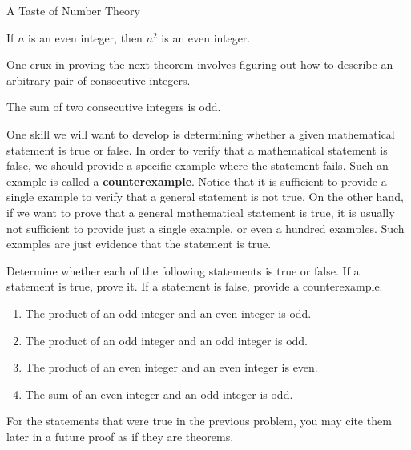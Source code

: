 \begin{section}{A Taste of Number Theory}
\begin{theorem}\label{thm:n even implies n^2 even}
If $n$ is an even integer, then $n^2$ is an even integer.
\end{theorem}

One crux in proving the next theorem involves figuring out how to describe an arbitrary pair of consecutive integers.

\begin{theorem}\label{thm:two consecutive ints}
The sum of two consecutive integers is odd.
\end{theorem}

One skill we will want to develop is determining whether a given mathematical statement is true or false.  In order to verify that a mathematical statement is false, we should provide a specific example where the statement fails. Such an example is called a \textbf{counterexample}.  Notice that it is sufficient to provide a single example to verify that a general statement is not true.  On the other hand, if we want to prove that a general mathematical statement is true, it is usually not sufficient to provide just a single example, or even a hundred examples.  Such examples are just evidence that the statement is true.

\begin{problem}
Determine whether each of the following statements is true or false.  If a statement is true, prove it. If a statement is false, provide a counterexample.
\begin{enumerate}[label=\textrm{(\alph*)}]
\item The product of an odd integer and an even integer is odd.
\item The product of an odd integer and an odd integer is odd.
\item The product of an even integer and an even integer is even.
\item The sum of an even integer and an odd integer is odd.
\end{enumerate}
\end{problem}

For the statements that were true in the previous problem, you may cite them later in a future proof as if they are theorems.



\end{section}
